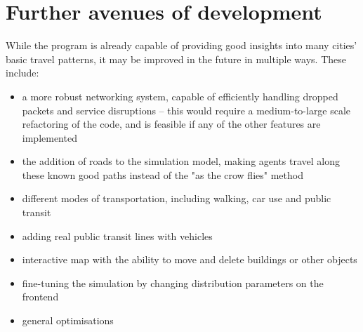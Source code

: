 \chapter{Further avenues of development}

While the program is already capable of providing good insights into many cities' basic travel patterns, it may be improved in the future in multiple ways. These include:
\begin{itemize}
    \item a more robust networking system, capable of efficiently handling dropped packets and service disruptions -- this would require a medium-to-large scale refactoring of the code, and is feasible if any of the other features are implemented
    \item the addition of roads to the simulation model, making agents travel along these known good paths instead of the "as the crow flies" method
    \item different modes of transportation, including walking, car use and public transit
    \item adding real public transit lines with vehicles 
    \item interactive map with the ability to move and delete buildings or other objects
    \item fine-tuning the simulation by changing distribution parameters on the frontend
    \item general optimisations
\end{itemize}
